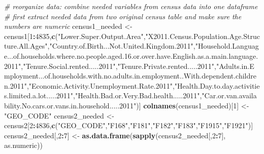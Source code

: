 \documentclass[]{article}
\newenvironment{Shaded}{\begin{snugshade}}{\end{snugshade}}
\newcommand{\KeywordTok}[1]{\textcolor[rgb]{0.13,0.29,0.53}{\textbf{#1}}}
\newcommand{\DecValTok}[1]{\textcolor[rgb]{0.00,0.00,0.81}{#1}}
\newcommand{\StringTok}[1]{\textcolor[rgb]{0.31,0.60,0.02}{#1}}
\newcommand{\CommentTok}[1]{\textcolor[rgb]{0.56,0.35,0.01}{\textit{#1}}}
\newcommand{\OperatorTok}[1]{\textcolor[rgb]{0.81,0.36,0.00}{\textbf{#1}}}
\newcommand{\NormalTok}[1]{#1}
\begin{document}
\begin{Shaded}
\begin{Highlighting}[]
\CommentTok{# reorganize data: combine needed variables from census data into one dataframe}
\CommentTok{# first extract needed data from two original census table and make sure the numbers are numeric}
\NormalTok{census1_needed <-}\StringTok{ }\NormalTok{census1[}\DecValTok{1}\OperatorTok{:}\DecValTok{4835}\NormalTok{,}\KeywordTok{c}\NormalTok{(}\StringTok{"Lower.Super.Output.Area"}\NormalTok{,}\StringTok{"X2011.Census.Population.Age.Structure.All.Ages"}\NormalTok{,}\StringTok{"Country.of.Birth...Not.United.Kingdom.2011"}\NormalTok{,}\StringTok{"Household.Language...of.households.where.no.people.aged.16.or.over.have.English.as.a.main.language.2011"}\NormalTok{,}\StringTok{"Tenure.Social.rented.....2011"}\NormalTok{,}\StringTok{"Tenure.Private.rented.....2011"}\NormalTok{,}\StringTok{"Adults.in.Employment...of.households.with.no.adults.in.employment..With.dependent.children.2011"}\NormalTok{,}\StringTok{"Economic.Activity.Unemployment.Rate.2011"}\NormalTok{,}\StringTok{"Health.Day.to.day.activities.limited.a.lot.....2011"}\NormalTok{,}\StringTok{"Health.Bad.or.Very.Bad.health.....2011"}\NormalTok{,}\StringTok{"Car.or.van.availability.No.cars.or.vans.in.household.....2011"}\NormalTok{)]}
\KeywordTok{colnames}\NormalTok{(census1_needed)[}\DecValTok{1}\NormalTok{] <-}\StringTok{ "GEO_CODE"}
\NormalTok{census2_needed <-}\StringTok{ }\NormalTok{census2[}\DecValTok{2}\OperatorTok{:}\DecValTok{4836}\NormalTok{,}\KeywordTok{c}\NormalTok{(}\StringTok{"GEO_CODE"}\NormalTok{,}\StringTok{"F168"}\NormalTok{,}\StringTok{"F181"}\NormalTok{,}\StringTok{"F182"}\NormalTok{,}\StringTok{"F183"}\NormalTok{,}\StringTok{"F1915"}\NormalTok{,}\StringTok{"F1921"}\NormalTok{)]}
\NormalTok{census2_needed[,}\DecValTok{2}\OperatorTok{:}\DecValTok{7}\NormalTok{] <-}\StringTok{ }\KeywordTok{as.data.frame}\NormalTok{(}\KeywordTok{sapply}\NormalTok{(census2_needed[,}\DecValTok{2}\OperatorTok{:}\DecValTok{7}\NormalTok{], as.numeric))}


\end{Highlighting}
\end{Shaded}
\end{document}
